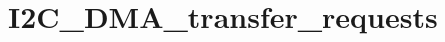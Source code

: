 \hypertarget{group___i2_c___d_m_a__transfer__requests}{\section{I2\-C\-\_\-\-D\-M\-A\-\_\-transfer\-\_\-requests}
\label{group___i2_c___d_m_a__transfer__requests}
}
